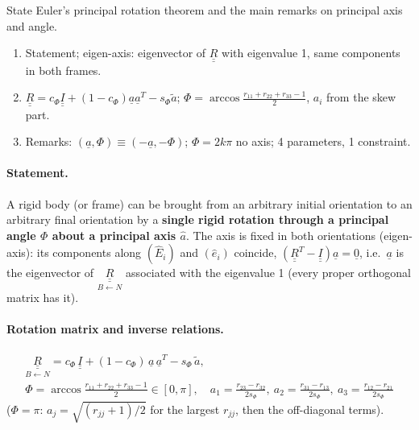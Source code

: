 \begin{qbox}
State Euler's principal rotation theorem and the main remarks on principal axis and angle.
\end{qbox}
\begin{outline}
\begin{enumerate}
\item Statement; eigen-axis: eigenvector of $\underline{\underline R}$ with eigenvalue 1, same components in both frames.
\item $\underline{\underline R}=c_\Phi\underline{\underline I}+(1-c_\Phi)\underline a\underline a^T-s_\Phi\tilde a$; $\Phi=\arccos\frac{r_{11}+r_{22}+r_{33}-1}{2}$, $a_i$ from the skew part.
\item Remarks: $(\underline a,\Phi)\equiv(-\underline a,-\Phi)$; $\Phi=2k\pi$ no axis; 4 parameters, 1 constraint.
\end{enumerate}
\end{outline}
\answer
\paragraph{Statement.} A rigid body (or frame) can be brought from an arbitrary initial orientation to an arbitrary final orientation by a
\textbf{single rigid rotation through a principal angle $\Phi$ about a principal axis $\hat a$}. The axis is fixed in both orientations (eigen-axis):
its components along $(\hat E_i)$ and $(\hat e_i)$ coincide, $(\underline{\underline R}^T-\underline{\underline I})\underline a=\underline 0$, i.e.\ $\underline a$ is the eigenvector of
$\underset{B\leftarrow N}{\underline{\underline R}}$ associated with the eigenvalue 1 (every proper orthogonal matrix has it).
\paragraph{Rotation matrix and inverse relations.}
\begin{equation}
\begin{gathered}
\underset{B\leftarrow N}{\underline{\underline R}}=c_\Phi\,\underline{\underline I}+(1-c_\Phi)\,\underline a\,\underline a^T-s_\Phi\,\tilde a,\\[2pt]
\Phi=\arccos\frac{r_{11}+r_{22}+r_{33}-1}{2}\in[0,\pi],\quad a_1=\frac{r_{23}-r_{32}}{2s_\Phi},\ a_2=\frac{r_{31}-r_{13}}{2s_\Phi},\ a_3=\frac{r_{12}-r_{21}}{2s_\Phi}
\end{gathered}
\end{equation}
($\Phi=\pi$: $a_j=\sqrt{(r_{jj}+1)/2}$ for the largest $r_{jj}$, then the off-diagonal terms).
